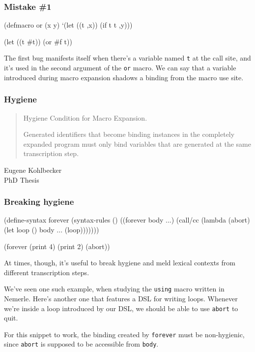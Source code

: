 \documentclass[hyperref={bookmarks=false}]{beamer}
\begin{document}
\begin{frame}[fragile]
\frametitle{Mistake \#1}

\begin{lstlistinglike}
\begin{semiverbatim}
(defmacro or (x y)
  `(let ((t ,x))
     (if t t ,y)))

(let ((t \#t))
  (or \#f t))
\end{semiverbatim}
\end{lstlistinglike}

The first bug manifests itself when there's a variable named \texttt{t} at the call site,
and it's used in the second argument of the \texttt{or} macro. We can say that a variable introduced during macro expansion shadows a binding from the macro use site.
\end{frame}

\begin{frame}[fragile]
\frametitle{Hygiene}

\begin{quote}
Hygiene Condition for Macro Expansion.

Generated identifiers that become binding instances in
the completely expanded program must only bind variables
that are generated at the same transcription step.
\end{quote}

\begin{flushright}
\textemdash Eugene Kohlbecker\\
PhD Thesis
\end{flushright}
\end{frame}

\begin{frame}[fragile]
\frametitle{Breaking hygiene}

\begin{lstlistinglike}
\begin{semiverbatim}
(define-syntax forever
  (syntax-rules ()
    ((forever body ...)
     (call/cc (lambda (abort)
                (let loop () body ... (loop)))))))

(forever (print 4) (print 2) (abort))
\end{semiverbatim}
\end{lstlistinglike}

At times, though, it's useful to break hygiene and meld lexical contexts
from different transcription steps.

We've seen one such example, when studying the \texttt{using} macro written in Nemerle.
Here's another one that features a DSL for writing loops. Whenever we're inside a loop
introduced by our DSL, we should be able to use \texttt{abort} to quit.

For this snippet to work, the binding created by \texttt{forever} must be non-hygienic,
since \texttt{abort} is supposed to be accessible from \texttt{body}.
\end{frame}
\end{document}
